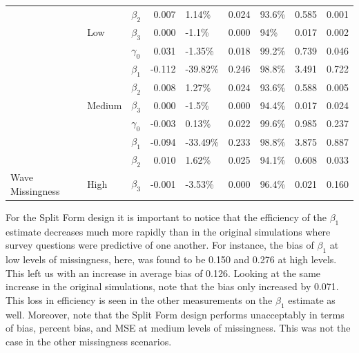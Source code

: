\documentclass{svjour3}\usepackage[]{graphicx}\usepackage[]{color}
\newenvironment{knitrout}{}{} %
\begin{document}
\begin{knitrout}
\begin{table}[!h]
{\begin{tabular}[t]{l|l|l|r|l|r|l|r|r}
 &  & $\beta_2$ & 0.007 & 1.14\% & 0.024 & 93.6\% & 0.585 & 0.001\\

 & \multirow{-4}{*}{\raggedright\arraybackslash Low} & $\beta_3$ & 0.000 & -1.1\% & 0.000 & 94\% & 0.017 & 0.002\\

 &  & $\gamma_0$ & 0.031 & -1.35\% & 0.018 & 99.2\% & 0.739 & 0.046\\

 &  & $\beta_1$ & -0.112 & -39.82\% & 0.246 & 98.8\% & 3.491 & 0.722\\

 &  & $\beta_2$ & 0.008 & 1.27\% & 0.024 & 93.6\% & 0.588 & 0.005\\

 & \multirow{-4}{*}{\raggedright\arraybackslash Medium} & $\beta_3$ & 0.000 & -1.5\% & 0.000 & 94.4\% & 0.017 & 0.024\\

 &  & $\gamma_0$ & -0.003 & 0.13\% & 0.022 & 99.6\% & 0.985 & 0.237\\

 &  & $\beta_1$ & -0.094 & -33.49\% & 0.233 & 98.8\% & 3.875 & 0.887\\

 &  & $\beta_2$ & 0.010 & 1.62\% & 0.025 & 94.1\% & 0.608 & 0.033\\

\multirow{-12}{*}{\raggedright\arraybackslash Wave Missingness} & \multirow{-4}{*}{\raggedright\arraybackslash High} & $\beta_3$ & -0.001 & -3.53\% & 0.000 & 96.4\% & 0.021 & 0.160\\
\hline
\end{tabular}}
\end{table}


\end{knitrout}

For the Split Form design it is important to notice that the efficiency of the $\beta_1$ estimate decreases much more rapidly than in the original simulations where survey questions were predictive of one another. For instance, the bias of $\beta_1$ at low levels of missingness, here, was found to be 0.150 and 0.276 at high levels. This left us with an increase in average bias of 0.126. Looking at the same increase in the original simulations, note that the bias only increased by 0.071. This loss in efficiency is seen in the other measurements on the $\beta_1$ estimate as well. Moreover, note that the Split Form design performs unacceptably in terms of bias, percent bias, and MSE at medium levels of missingness. This was not the case in the other missingness scenarios. \par
\end{document}
